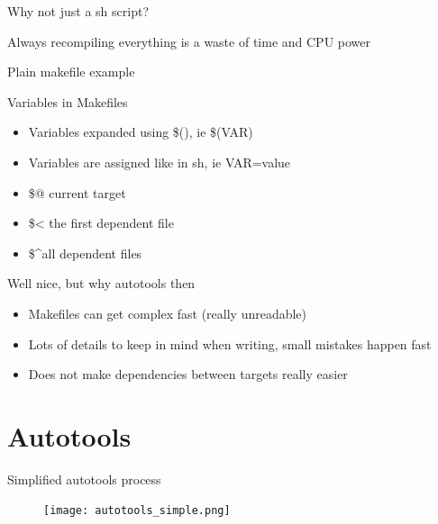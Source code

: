 \documentclass{beamer}
\begin{document}
\begin{frame}{Why not just a sh script?}
	\begin{center}
    \item Always recompiling everything is a waste of time and CPU power
	\end{center}
\end{frame}

\begin{frame}[t]{Plain makefile example}
	\begin{small}
	
	\end{small}
\end{frame}

\begin{frame}{Variables in Makefiles}
    \begin{itemize}
    \item Variables expanded using \$(), ie \$(VAR)
    \item Variables are assigned like in sh, ie VAR=value
    \item \$@ current target
    \item \$< the first dependent file
    \item \$\textasciicircum all dependent files
    \end{itemize}
\end{frame}

\begin{frame}{Well nice, but why autotools then}
    \begin{itemize}
    \item Makefiles can get complex fast (really unreadable)
    \item Lots of details to keep in mind when writing, small mistakes happen fast
    \item Does not make dependencies between targets really easier
    \end{itemize}
\end{frame}

\section{Autotools}

\begin{frame}{Simplified autotools process}
	\begin{figure}
	\texttt{[image: autotools\_simple.png]}
	\end{figure}
\end{frame}
\end{document}

